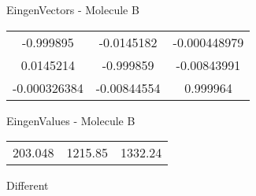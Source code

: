 \begin{multicols}{2}
\begin{center}
\vtab
 EingenVectors - Molecule B     \\
\vtab
\begin{tabular}{|c c c|}
-0.999895	 & 	-0.0145182	 & 	-0.000448979	 \\
0.0145214	 & 	-0.999859	 & 	-0.00843991	 \\
-0.000326384	 & 	-0.00844554	 & 	0.999964
\end{tabular}

\vtab
 EingenValues - Molecule B     \\
\vtab
\begin{tabular}{|c c c|}
203.048	 & 	1215.85	 & 	1332.24	 \\
\end{tabular}

\end{center}
\end{multicols}
\begin{center}
\vtab
\vtab
\textcolor{NavyBlue}{\Large Different}
\end{center}

 \newpage

